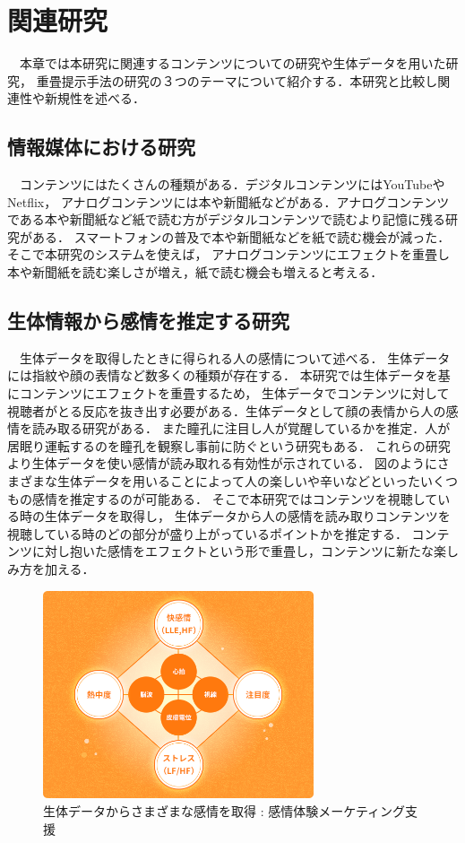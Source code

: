 \thispagestyle{myheadings}
\chapter{関連研究}
　本章では本研究に関連するコンテンツについての研究や生体データを用いた研究，
重畳提示手法の研究の３つのテーマについて紹介する．本研究と比較し関連性や新規性を述べる．



\section{情報媒体における研究}
　コンテンツにはたくさんの種類がある．デジタルコンテンツにはYouTubeやNetflix，
アナログコンテンツには本や新聞紙などがある．アナログコンテンツである本や新聞紙など紙で読む方がデジタルコンテンツで読むより記憶に残る研究がある\cite{books}．
スマートフォンの普及で本や新聞紙などを紙で読む機会が減った．そこで本研究のシステムを使えば，
アナログコンテンツにエフェクトを重畳し本や新聞紙を読む楽しさが増え，紙で読む機会も増えると考える．

\section{生体情報から感情を推定する研究}

　生体データを取得したときに得られる人の感情について述べる．
生体データには指紋や顔の表情など数多くの種類が存在する．
本研究では生体データを基にコンテンツにエフェクトを重畳するため，
生体データでコンテンツに対して視聴者がとる反応を抜き出す必要がある．生体データとして顔の表情から人の感情を読み取る研究がある\cite{hyoujou,hyoujou2}．
また瞳孔に注目し人が覚醒しているかを推定．人が居眠り運転するのを瞳孔を観察し事前に防ぐという研究もある\cite{doukou}．
これらの研究より生体データを使い感情が読み取れる有効性が示されている．
図のようにさまざまな生体データを用いることによって人の楽しいや辛いなどといったいくつもの感情を推定するのが可能ある．
そこで本研究ではコンテンツを視聴している時の生体データを取得し，
生体データから人の感情を読み取りコンテンツを視聴している時のどの部分が盛り上がっているポイントかを推定する．
コンテンツに対し抱いた感情をエフェクトという形で重畳し，コンテンツに新たな楽しみ方を加える．

\begin{figure}[H]
    \centering
    \includegraphics[width=8cm]{images/chapter2/heart.png}
    \caption{生体データからさまざまな感情を取得 : 感情体験メーケティング支援}
\end{figure}


